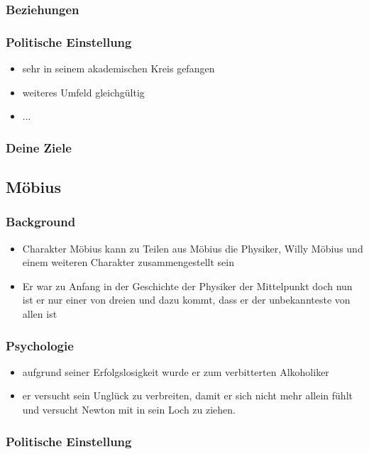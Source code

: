 \documentclass[12pt, a4paper, openany]{report}
\begin{document}
\subsubsection{Beziehungen}

\subsubsection{Politische Einstellung}
\begin{itemize}
\item sehr in seinem akademischen Kreis gefangen
\item weiteres Umfeld gleichgültig
\item ...
\end{itemize}
\subsubsection{Deine Ziele}

\subsection{Möbius}
\subsubsection{Background}
\begin{itemize}
\item Charakter Möbius kann zu Teilen aus Möbius die Physiker, Willy Möbius und einem weiteren Charakter zusammengestellt sein
\item Er war zu Anfang in der Geschichte der Physiker der Mittelpunkt doch nun ist er nur einer von dreien und dazu kommt, dass er der unbekannteste von allen ist
\end{itemize}

\subsubsection{Psychologie}
\begin{itemize}
\item aufgrund seiner Erfolgslosigkeit wurde er zum verbitterten Alkoholiker
\item er versucht sein Unglück zu verbreiten, damit er sich nicht mehr allein fühlt und versucht Newton mit in sein Loch zu ziehen.
\end{itemize}
\subsubsection{Politische Einstellung}
\end{document}
